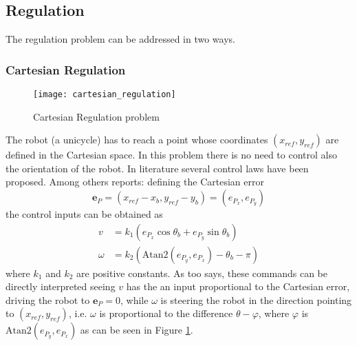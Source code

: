 \subsection{Regulation}
The regulation problem can be addressed in two ways.
\subsubsection{Cartesian Regulation}
\begin{figure}[h!]
	\centering
	\texttt{[image: cartesian\_regulation]}
	\caption{Cartesian Regulation problem}
	\label{cartregulation} 
\end{figure}
The robot (a unicycle) has to reach a point whose coordinates $(x_{ref},y_{ref})$ are defined in the Cartesian space. In this problem there is no need to control also the orientation of the robot. 
In literature several control laws have been proposed. Among others \cite{siciliano} reports: defining the Cartesian error $$\mathbf{e}_P=(x_{ref}-x_b,y_{ref}-y_b)=(e_{P_x},e_{P_y})$$ the control inputs can be obtained as
\begin{align}
	v &= k_1(e_{P_x}\cos\theta_b+e_{P_y}\sin\theta_b)\\
	\omega &= k_2\left(\text{Atan2}\left(e_{P_y},e_{P_x}\right)-\theta_b-\pi\right)
\end{align}
where $k_1$ and $k_2$ are positive constants. 
As \cite{siciliano} too says, these commands can be directly interpreted seeing $v$ has the an input proportional to the Cartesian error, driving the robot to $\mathbf{e}_P=0$, while $\omega$ is steering the robot in the direction pointing to $(x_{ref},y_{ref})$, i.e. $\omega$ is proportional to the difference $\theta-\varphi$, where $\varphi$ is $\text{Atan2}\left(e_{P_y},e_{P_x}\right)$ as can be seen in Figure \ref{cartregulation}.
